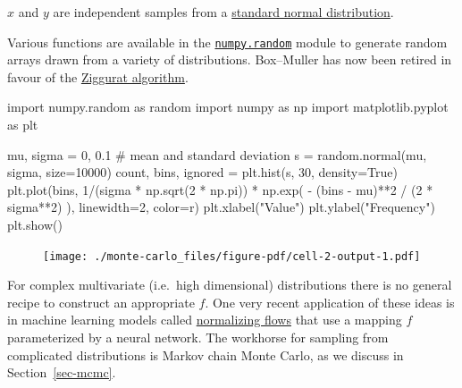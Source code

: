 \documentclass[
  letterpaper,
  DIV=11,
  numbers=noendperiod]{scrreprt}
\newenvironment{Shaded}{\begin{snugshade}}{\end{snugshade}}
\newcommand{\CommentTok}[1]{\textcolor[rgb]{0.37,0.37,0.37}{#1}}
\newcommand{\DecValTok}[1]{\textcolor[rgb]{0.68,0.00,0.00}{#1}}
\newcommand{\FloatTok}[1]{\textcolor[rgb]{0.68,0.00,0.00}{#1}}
\newcommand{\ImportTok}[1]{\textcolor[rgb]{0.00,0.46,0.62}{#1}}
\newcommand{\NormalTok}[1]{\textcolor[rgb]{0.00,0.23,0.31}{#1}}
\newcommand{\OperatorTok}[1]{\textcolor[rgb]{0.37,0.37,0.37}{#1}}
\newcommand{\StringTok}[1]{\textcolor[rgb]{0.13,0.47,0.30}{#1}}
\newcommand{\VariableTok}[1]{\textcolor[rgb]{0.07,0.07,0.07}{#1}}
\theoremstyle{definition}
\theoremstyle{remark}
\begin{document}
\(x\) and \(y\) are independent samples from a
\href{https://en.wikipedia.org/wiki/Standard_normal_distribution}{standard
normal distribution}.

Various functions are available in the
\href{https://numpy.org/doc/stable/reference/random/index.html\#module-numpy.random}{\texttt{numpy.random}}
module to generate random arrays drawn from a variety of distributions.
Box--Muller has now been retired in favour of the
\href{https://en.wikipedia.org/wiki/Ziggurat_algorithm}{Ziggurat
algorithm}.

\begin{Shaded}
\begin{Highlighting}[]
\ImportTok{import}\NormalTok{ numpy.random }\ImportTok{as}\NormalTok{ random}
\ImportTok{import}\NormalTok{ numpy }\ImportTok{as}\NormalTok{ np}
\ImportTok{import}\NormalTok{ matplotlib.pyplot }\ImportTok{as}\NormalTok{ plt}

\NormalTok{mu, sigma }\OperatorTok{=} \DecValTok{0}\NormalTok{, }\FloatTok{0.1} \CommentTok{\# mean and standard deviation}
\NormalTok{s }\OperatorTok{=}\NormalTok{ random.normal(mu, sigma, size}\OperatorTok{=}\DecValTok{10000}\NormalTok{)}
\NormalTok{count, bins, ignored }\OperatorTok{=}\NormalTok{ plt.hist(s, }\DecValTok{30}\NormalTok{, density}\OperatorTok{=}\VariableTok{True}\NormalTok{)}
\NormalTok{plt.plot(bins, }\DecValTok{1}\OperatorTok{/}\NormalTok{(sigma }\OperatorTok{*}\NormalTok{ np.sqrt(}\DecValTok{2} \OperatorTok{*}\NormalTok{ np.pi)) }\OperatorTok{*}
\NormalTok{               np.exp( }\OperatorTok{{-}}\NormalTok{ (bins }\OperatorTok{{-}}\NormalTok{ mu)}\OperatorTok{**}\DecValTok{2} \OperatorTok{/}\NormalTok{ (}\DecValTok{2} \OperatorTok{*}\NormalTok{ sigma}\OperatorTok{**}\DecValTok{2}\NormalTok{) ),}
\NormalTok{         linewidth}\OperatorTok{=}\DecValTok{2}\NormalTok{, color}\OperatorTok{=}\StringTok{\textquotesingle{}r\textquotesingle{}}\NormalTok{)}
\NormalTok{plt.xlabel(}\StringTok{"Value"}\NormalTok{)}
\NormalTok{plt.ylabel(}\StringTok{"Frequency"}\NormalTok{)}
\NormalTok{plt.show()}
\end{Highlighting}
\end{Shaded}

\begin{figure}[H]

{\centering \texttt{[image: ./monte-carlo\_files/figure-pdf/cell-2-output-1.pdf]}

}

\end{figure}

For complex multivariate (i.e.~high dimensional) distributions there is
no general recipe to construct an appropriate \(f\). One very recent
application of these ideas is in machine learning models called
\href{https://arxiv.org/abs/1908.09257}{normalizing flows} that use a
mapping \(f\) parameterized by a neural network. The workhorse for
sampling from complicated distributions is Markov chain Monte Carlo, as
we discuss in Section~\ref{sec-mcmc}.
\end{document}
